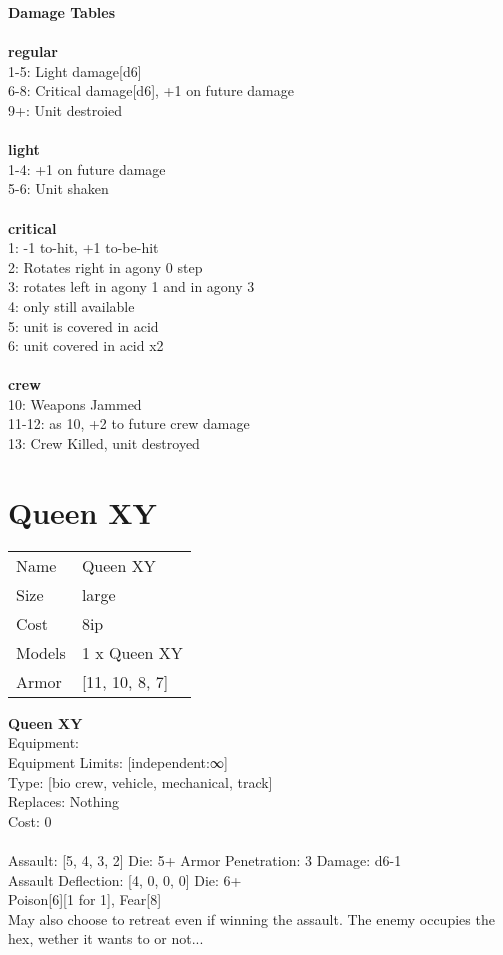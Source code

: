 {\bf Damage Tables} \\
\ \\ {\bf regular } \\
1-5: Light damage[d6] \\
6-8: Critical damage[d6], +1 on future damage \\
9+: Unit destroied \\
\ \\ {\bf light } \\
1-4: +1 on future damage \\
5-6: Unit shaken \\
\ \\ {\bf critical } \\
1: -1 to-hit, +1 to-be-hit \\
2: Rotates right in agony 0 step \\
3: rotates left in agony 1 and in agony 3 \\
4: only still available \\
5: unit is covered in acid \\
6: unit covered in acid x2 \\
\ \\ {\bf crew } \\
10: Weapons Jammed \\
11-12: as 10, +2 to future crew damage \\
13: Crew Killed, unit destroyed \\










\pagebreak\pagebreak

\section{ Queen XY }

\begin{tabular}{ll}
  Name & Queen XY \\
  Size & large\\
  Cost & 8ip\\
  Models & 1 x Queen XY\\
  Armor & [11, 10, 8, 7]\\
\end{tabular}

\noindent 

{\bf Queen XY } \\
Equipment:  \\
Equipment Limits: [independent:∞] \\
Type: [bio crew, vehicle, mechanical, track] \\
Replaces: Nothing \\
Cost: 0\\
\ \\
Assault: [5, 4, 3, 2] Die: 5+ Armor Penetration: 3 Damage: d6-1 \\
Assault Deflection: [4, 0, 0, 0] Die: 6+\\
\indent Poison[6][1 for 1], Fear[8]\\ 
May also choose to retreat even if winning the assault. The enemy occupies the hex, wether it wants to or not...\\ 
 
